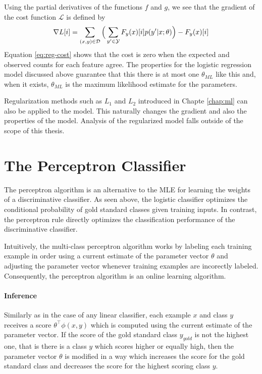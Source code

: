 Using the partial derivatives of the functions $f$ and $g$, we see that the gradient of the cost function $\mathcal{L}$ is defined by
\begin{equation}\nabla L[i] = \sum_{(x,y) \in \mathcal{D}} \Big( \sum_{y' \in \mathcal{Y}}F_y(x)[i] p(y'|x\mbox{$ ; \, $}\theta) \Big) - F_y(x)[i] \label{eq:reg-cost}\end{equation}
Equation \ref{eq:reg-cost} shows that the cost is zero when the
expected and observed counts for each feature agree. The properties
for the logistic regression model discussed above guarantee that this
there is at most one $\theta_{ML}$ like this and, when it exists,
$\theta_{ML}$ is the maximum likelihood estimate for the parameters.

Regularization methods such as $L_1$ and $L_2$ introduced in Chapte
\ref{chap:ml} can also be applied to the model. This naturally changes
the gradient and also the properties of the model. Analysis of the
regularized model falls outside of the scope of this thesis.

\section{The Perceptron Classifier}

The perceptron algorithm \citep{Rosenblatt1958} is an alternative to the MLE
for learning the weights of a discriminative classifier. As seen
above, the logistic classifier optimizes the conditional probability
of gold standard classes given training inputs. In contrast, the
perceptron rule directly optimizes the classification performance of
the discriminative classifier.

Intuitively, the multi-class perceptron algorithm works by labeling
each training example in order using a current estimate of the
parameter vector $\theta$ and adjusting the parameter vector whenever
training examples are incorectly labeled. Consequently, the perceptron
algorithm is an online learning algorithm.

\paragraph{Inference} Similarly as in the case of any linear
classifier, each example $x$ and class $y$ receives a score
$\theta^\top\phi(x,y)$ which is computed using the current estimate of
the parameter vector. If the score of the gold standard class
$y_{gold}$ is not the highest one, that is there is a class $y$ which
scores higher or equally high, then the parameter vector $\theta$ is
modified in a way which increases the score for the gold standard
class and decreases the score for the highest scoring class $y$.

